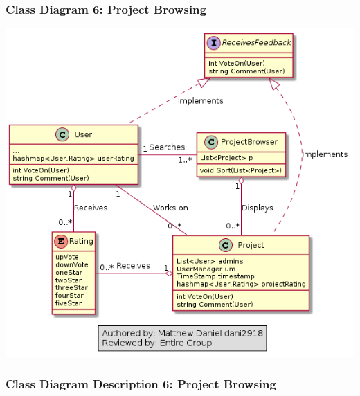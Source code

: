 \documentclass[twoside,letterpaper]{article}
\begin{document}
	\subsubsection[Class Diagram 6: Project Browsing]{\rmfamily\bfseries\color{black}
		Class Diagram 6: Project Browsing}
	\hypertarget{RefHeading22059017292}{}
	\bigskip
	
	\includegraphics[width=6.0in]{images/ClassDiagrams/ProjectBrowsing}
	
	\newpage
	
	\subsubsection[Class Diagram Description 6: Project Browsing]{\rmfamily\bfseries\color{black}
		Class Diagram Description 6: Project Browsing}
	\hypertarget{RefHeading22059017292}{}
	
\end{document}
